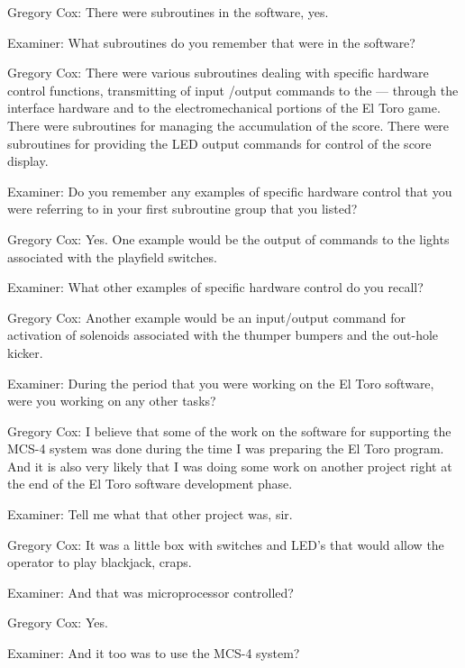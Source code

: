\textcolor{interviewee}{Gregory Cox:} There were subroutines in the software, yes. 

\textcolor{interviewer}{Examiner:} What subroutines do you remember that were in the software? 

\textcolor{interviewee}{Gregory Cox:} There were various subroutines dealing with specific hardware control functions, transmitting of input /output commands to the — through the interface hardware and to the electromechanical portions of the El Toro game. There were subroutines for managing the accumulation of the score. There were subroutines for providing the LED output commands for control of the score display. 

\textcolor{interviewer}{Examiner:} Do you remember any examples of specific hardware control that you were referring to in your first subroutine group that you listed?

\textcolor{interviewee}{Gregory Cox:} Yes. One example would be the output of commands to the lights associated with the playfield switches. 

\textcolor{interviewer}{Examiner:} What other examples of specific hardware control do you recall? 

\textcolor{interviewee}{Gregory Cox:} Another example would be an input/output command for activation of solenoids associated with the thumper bumpers and the out-hole kicker. 

\textcolor{interviewer}{Examiner:} During the period that you were working on the El Toro software, were you working on any other tasks? 

\textcolor{interviewee}{Gregory Cox:} I believe that some of the work on the software for supporting the MCS-4 system was done during the time I was preparing the El Toro program. And it is also very likely that I was doing some work on another project right at the end of the El Toro software development phase. 

\textcolor{interviewer}{Examiner:} Tell me what that other project was, sir. 

\textcolor{interviewee}{Gregory Cox:} It was a little box with switches and LED's that would allow the operator to play blackjack, craps. 

\textcolor{interviewer}{Examiner:} And that was microprocessor controlled? 

\textcolor{interviewee}{Gregory Cox:} Yes. 

\textcolor{interviewer}{Examiner:} And it too was to use the MCS-4 system? 

